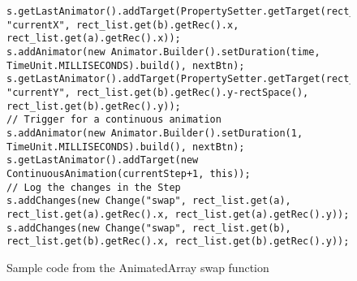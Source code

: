 \begin{figure}
\begin{center}
\begin{verbatim}
s.getLastAnimator().addTarget(PropertySetter.getTarget(rect_list.get(b), "currentX", rect_list.get(b).getRec().x, rect_list.get(a).getRec().x));
s.addAnimator(new Animator.Builder().setDuration(time, TimeUnit.MILLISECONDS).build(), nextBtn);
s.getLastAnimator().addTarget(PropertySetter.getTarget(rect_list.get(b), "currentY", rect_list.get(b).getRec().y-rectSpace(), rect_list.get(b).getRec().y));
// Trigger for a continuous animation
s.addAnimator(new Animator.Builder().setDuration(1, TimeUnit.MILLISECONDS).build(), nextBtn);
s.getLastAnimator().addTarget(new ContinuousAnimation(currentStep+1, this));
// Log the changes in the Step
s.addChanges(new Change("swap", rect_list.get(a), rect_list.get(a).getRec().x, rect_list.get(a).getRec().y));
s.addChanges(new Change("swap", rect_list.get(b), rect_list.get(b).getRec().x, rect_list.get(b).getRec().y));
\end{verbatim}
\end{center}
\caption{Sample code from the AnimatedArray swap function}
\label{fig:swap}
\end{figure}